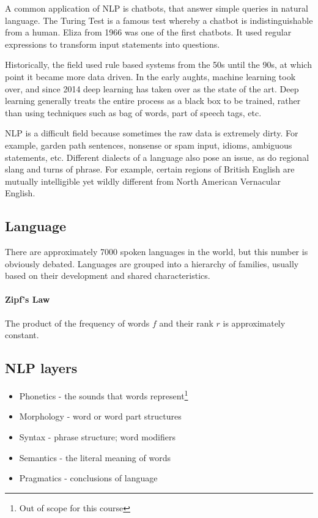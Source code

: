 \documentclass{idc_msc}
\begin{document}
A common application of NLP is chatbots, that answer simple queries in natural language.
The Turing Test is a famous test whereby a chatbot is indistinguishable from a human.
Eliza\cite{weizenbaum1966eliza} from 1966 was one of the first chatbots.
It used regular expressions to transform input statements into questions.

Historically, the field used rule based systems from the 50s until the 90s, at which point it became more data driven.
In the early aughts, machine learning took over, and since 2014 deep learning has taken over as the state of the art.
Deep learning generally treats the entire process as a black box to be trained, rather than using techniques such as bag of words, part of speech tags, etc.

NLP is a difficult field because sometimes the raw data is extremely dirty.
For example, garden path sentences, nonsense or spam input, idioms, ambiguous statements, etc.
Different dialects of a language also pose an issue, as do regional slang and turns of phrase.
For example, certain regions of British English are mutually intelligible yet wildly different from North American Vernacular English.

\subsection{Language}

There are approximately 7000 spoken languages in the world, but this number is obviously debated.
Languages are grouped into a hierarchy of families, usually based on their development and shared characteristics.

\paragraph{Zipf's Law}

The product of the frequency of words \(f\) and their rank \(r\) is approximately constant.

\subsection{NLP layers}

\begin{itemize}
  \item Phonetics - the sounds that words represent\footnote{Out of scope for this course}
  \item Morphology - word or word part structures
  \item Syntax - phrase structure; word modifiers
  \item Semantics - the literal meaning of words
  \item Pragmatics - conclusions of language
\end{itemize}
\end{document}
